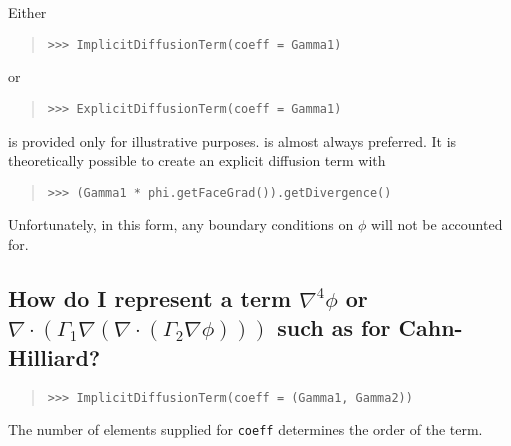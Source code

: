            Either
           \begin{quote}
\begin{verbatim}
>>> ImplicitDiffusionTerm(coeff = Gamma1)
\end{verbatim}
           \end{quote}
           or 
           \begin{quote}
\begin{verbatim}
>>> ExplicitDiffusionTerm(coeff = Gamma1)
\end{verbatim}
           \end{quote}
            is provided only for illustrative purposes.
            is almost always preferred. It is
           theoretically possible to create an explicit diffusion term with
           \begin{quote}
\begin{verbatim}
>>> (Gamma1 * phi.getFaceGrad()).getDivergence()
\end{verbatim}
           \end{quote}
           Unfortunately, in this form, any boundary conditions on $\phi$
           will not be accounted for.

            
           
           \subsection{How do I represent a term $\nabla^4 \phi$ or
            $\nabla \cdot \left( \Gamma_1 \nabla \left(
            \nabla\cdot\left( 
            \Gamma_2 \nabla \phi\right) \right) \right) $ such as for 
            Cahn-Hilliard? \label{subsection:higherOrderDiffusion}}
          \hspace*{\fill}
            
          \begin{quote}
\begin{verbatim}
>>> ImplicitDiffusionTerm(coeff = (Gamma1, Gamma2))
\end{verbatim}
          \end{quote}
          The number of elements supplied for \verb|coeff| determines the
          order of the term.

